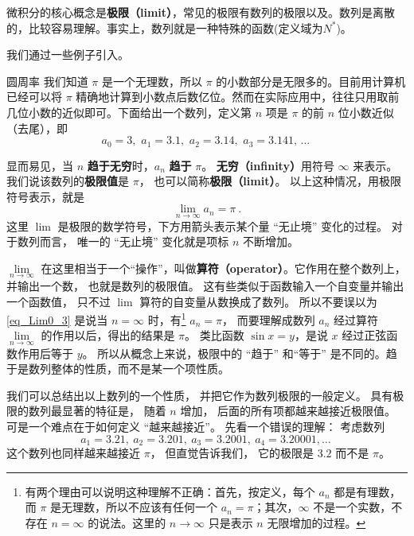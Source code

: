 
微积分的核心概念是\textbf{极限（limit）}，常见的极限有数列的极限以及。数列是离散的，比较容易理解。事实上，数列就是一种特殊的函数(定义域为$N^{*}$)。

我们通过一些例子引入。

\begin{example}{圆周率}\label{ex_Lim0_1}
我们知道 $\pi$ 是一个无理数，所以 $\pi$ 的小数部分是无限多的。目前用计算机已经可以将 $\pi$ 精确地计算到小数点后数亿位。然而在实际应用中，往往只用取前几位小数的近似即可。下面给出一个数列，定义第 $n$ 项是 $\pi$ 的前 $n$ 位小数近似（去尾），即
\begin{equation}\label{eq_Lim0_1}
a_0 = 3,\,\, a_1 = 3.1,\,\, a_2 = 3.14,\,\, a_3 = 3.141,\,\dots~
\end{equation}

显而易见，当 $n$ \textbf{趋于无穷}时，$a_n$ \textbf{趋于} $\pi$。 \textbf{无穷（infinity）}用符号 $\infty$ 来表示。 我们说该数列的\textbf{极限值}是 $\pi$， 也可以简称\textbf{极限（limit）}。 以上这种情况，用极限符号表示，就是
\begin{equation}\label{eq_Lim0_3}
\lim_{n \to \infty } {a_n} = \pi ~.
\end{equation}
这里 $\lim$ 是极限的数学符号，下方用箭头表示某个量 “无止境” 变化的过程。 对于数列而言， 唯一的 “无止境” 变化就是项标 $n$ 不断增加。%
\end{example}



$\lim\limits_{n \to \infty }$ 在这里相当于一个“操作”，叫做\textbf{算符（operator）}。它作用在整个数列上，并输出一个数， 也就是数列的极限值。 这有些类似于函数输入一个自变量并输出一个函数值， 只不过 $\lim$ 算符的自变量从数换成了数列。 所以不要误以为\autoref{eq_Lim0_3} 是说当 $n = \infty$ 时，有\footnote{有两个理由可以说明这种理解不正确：首先，按定义，每个 $a_n$ 都是有理数，而 $\pi$ 是无理数，所以不应该有任何一个 $a_n=\pi$；其次，$\infty$ 不是一个实数，不存在 $n=\infty$ 的说法。这里的 $n\to\infty$ 只是表示 $n$ 无限增加的过程。} $a_n=\pi$， 而要理解成数列 $a_n$ 经过算符 $\lim\limits_{n \to \infty }$ 的作用以后，得出的结果是 $\pi$。 类比函数 $\sin x = y$，是说 $x$ 经过正弦函数作用后等于 $y$。 所以从概念上来说，极限中的 “趋于” 和“等于” 是不同的。趋于是数列整体的性质，而不是某一个项性质。

我们可以总结出以上数列的一个性质， 并把它作为数列极限的一般定义。 具有极限的数列最显著的特征是， 随着 $n$ 增加， 后面的所有项都越来越接近极限值。 可是一个难点在于如何定义 “越来越接近”。 先看一个错误的理解： 考虑数列
\begin{equation}\label{eq_Lim0_2}
a_1 = 3.21,\ a_2 = 3.201,\ a_3 = 3.2001,\ a_4 = 3.20001, \dots~
\end{equation}
这个数列也同样越来越接近 $\pi$， 但直觉告诉我们， 它的极限是 $3.2$ 而不是 $\pi$。

